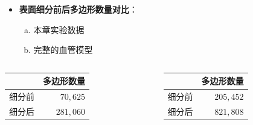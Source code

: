 \begin{frame}
\begin{itemize}
  \item \textbf{表面细分前后多边形数量对比}：
  \begin{enumerate}[(a)]
    \item 本章实验数据
    \item 完整的血管模型
  \end{enumerate}
\end{itemize}
\begin{table}[t]
\renewcommand{\arraystretch}{0.5}
\centering
\begin{columns}[b,onlytextwidth]
\begin{column}{.5\textwidth}
\begin{tabular*}{40mm}{lr}
\toprule
~              & \small{多边形数量} \\
\midrule
\small{细分前} & \small{$70,625$}     \\
\midrule
\small{细分后} & \small{$281,060$}    \\
\bottomrule
\end{tabular*}
\end{column}
\begin{column}{.5\textwidth}
\begin{tabular*}{40mm}{lr}
\toprule
~              & \small{多边形数量} \\
\midrule
\small{细分前} & \small{$205,452$}    \\
\midrule
\small{细分后} & \small{$821,808$}    \\
\bottomrule
\end{tabular*}
\end{column}
\end{columns}
\end{table}
\end{frame} 

